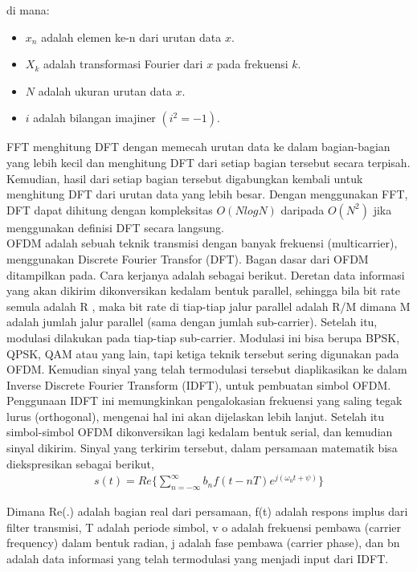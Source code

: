 \documentclass{article}
\begin{document}
di mana:
\begin{itemize}
    \item $x_n$ adalah elemen ke-n dari urutan data $x$.
    \item $X_k$ adalah transformasi Fourier dari $x$ pada frekuensi $k$.
    \item $N$ adalah ukuran urutan data $x$.
    \item $i$ adalah bilangan imajiner $(i^2 = -1)$.
\end{itemize}

FFT menghitung DFT dengan memecah urutan data ke dalam bagian-bagian yang lebih kecil dan menghitung DFT dari setiap bagian tersebut secara terpisah. Kemudian, hasil dari setiap bagian tersebut digabungkan kembali untuk menghitung DFT dari urutan data yang lebih besar. Dengan menggunakan FFT, DFT dapat dihitung dengan kompleksitas $O(N log N)$ daripada $O(N^2)$ jika menggunakan definisi DFT secara langsung.
\\

OFDM adalah sebuah teknik transmisi dengan banyak frekuensi (multicarrier), menggunakan Discrete Fourier Transfor (DFT). Bagan dasar dari OFDM ditampilkan pada. Cara kerjanya adalah sebagai berikut. Deretan data informasi yang akan dikirim dikonversikan kedalam bentuk parallel, sehingga bila bit rate semula adalah R , maka bit rate di tiap-tiap jalur parallel adalah R/M dimana M adalah jumlah jalur parallel (sama dengan jumlah sub-carrier). Setelah itu, modulasi dilakukan pada tiap-tiap sub-carrier. Modulasi ini bisa berupa BPSK, QPSK, QAM atau yang lain, tapi ketiga teknik tersebut sering digunakan pada OFDM. Kemudian sinyal yang telah termodulasi tersebut diaplikasikan ke dalam Inverse Discrete Fourier Transform (IDFT), untuk pembuatan simbol OFDM. Penggunaan IDFT ini memungkinkan pengalokasian frekuensi yang saling tegak lurus (orthogonal), mengenai hal ini akan dijelaskan lebih lanjut. Setelah itu simbol-simbol OFDM dikonversikan lagi kedalam bentuk serial, dan kemudian sinyal dikirim. Sinyal yang terkirim tersebut, dalam persamaan matematik bisa diekspresikan sebagai berikut,  
\begin{align}
    \boxed{s(t) = Re \Big\{\sum_{n=-\infty}^{\infty} b_n f(t-nT)e^{j(\omega_0t+\psi)}\Big\}}\nonumber
\end{align}

Dimana Re(.) adalah bagian real dari persamaan, f(t) adalah respons implus dari filter transmisi, T adalah periode simbol, v o adalah frekuensi pembawa (carrier frequency) dalam bentuk radian, j adalah fase pembawa (carrier phase), dan bn adalah data informasi yang telah termodulasi yang menjadi input dari IDFT.  
\end{document}
